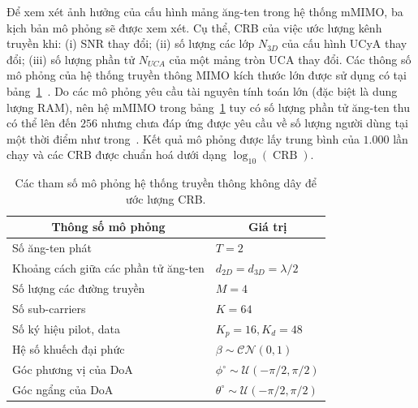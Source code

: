 Để xem xét ảnh hưởng của cấu hình mảng ăng-ten trong hệ thống mMIMO, ba kịch bản mô phỏng sẽ được xem xét. Cụ thể, CRB của việc ước lượng kênh truyền khi: (i) SNR thay đổi; (ii) số lượng các lớp $N_{3D}$ của cấu hình UCyA thay đổi; (iii) số lượng phần tử $N_{UCA}$ của một mảng tròn UCA thay đổi. Các thông số mô phỏng của hệ thống truyền thông MIMO kích thước lớn được sử dụng có tại bảng~\ref{tab:simulation_param_CRB}~\cite{Swindlehurst2022}. Do các mô phỏng yêu cầu tài nguyên tính toán lớn (đặc biệt là dung lượng RAM), nên hệ mMIMO trong bảng~\ref{tab:simulation_param_CRB} tuy có số lượng phần tử ăng-ten thu có thể lên đến $256$ nhưng chưa đáp ứng được yêu cầu về số lượng người dùng tại một thời điểm như trong~\cite{Larsson2014}. Kết quả mô phỏng được lấy trung bình của $1.000$ lần chạy và các CRB được chuẩn hoá dưới dạng $\log_{10} (\operatorname{CRB})$.
\begin{table}[ht]
\centering
\caption{Các tham số mô phỏng hệ thống truyền thông không dây để ước lượng CRB.}
\label{tab:simulation_param_CRB}
\begin{tabular}{p{8cm} | p{6cm}}
\hline
\hline
\multicolumn{1}{c|}{\textbf{Thông số mô phỏng}} & \multicolumn{1}{c}{\textbf{Giá trị}} \\ \hline
Số ăng-ten phát                            & $T = 2$      \\ \hline
Khoảng cách giữa các phần tử ăng-ten                 & $d_{2D} = d_{3D} = \lambda / 2$ \\ \hline
Số lượng các đường truyền                   & $M = 4$      \\ \hline
Số sub-carriers                    & $K = 64$     \\ \hline
Số ký hiệu pilot, data                          & $K_p = 16, K_d = 48$     \\ \hline
Hệ số khuếch đại phức               & $\beta \sim \mathcal{C} \mathcal{N}\left(0, 1 \right)$     \\ \hline
Góc phương vị của DoA            & $\phi^\circ \sim \mathcal{U}(-\pi/2, \pi/2)$        \\ \hline
Góc ngẩng của DoA           & $\theta^\circ \sim \mathcal{U}(-\pi/2, \pi/2)$       \\ \hline
\end{tabular}
\end{table}
